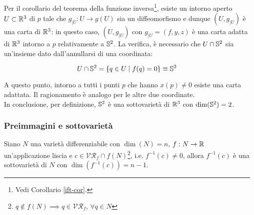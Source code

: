 Per il corollario del teorema della funzione inversa\footnote{%
	Vedi Corollario \ref{ift-cor}.%
}, esiste un intorno aperto $ U \subset \R^{3} $ di $ p $ tale che $ g_{|U} : U \to g(U) $ sia un diffeomorfismo e dunque $ (U,g_{|U}) $ è una carta di $ \R^{3} $: in questo caso, $ (U,g_{|U}) $ con $ g_{|U} = (f,y,z) $ è una carta adatta di $ \R^{3} $ intorno a $ p $ relativamente a $ \S^{2} $. La verifica, è necessario che $ U \cap \S^{2} $ sia un'insieme dato dall'annullarsi di una coordinata:

\begin{equation}
	U \cap \S^{2} = \{ q \in U \mid f(q) = 0 \} \equiv \S^{2}
\end{equation}

A questo punto, intorno a tutti i punti $ p $ che hanno $ x(p) \neq 0 $ esiste una carta adattata. Il ragionamento è analogo per le altre due coordinate.\\
In conclusione, per definizione, $ \S^{2}$ è una sottovarietà di $\R^{3} $ con $ \dim(\S^{2})=2 $.

\subsubsection{Preimmagini e sottovarietà}

\begin{theorem}[Preimmagine di un valore regolare (caso $ M = \R $)]
	Siano $ N $ una varietà differenziabile con $ \dim(N)=n $, $ f : N \to \R $ un'applicazione liscia e $ c \in \mathcal{VR}_{f} \cap f(N) $\footnote{%
		$ q \notin f(N) \implies q \in \mathcal{VR}_{f}, \, \forall q \in N $%
	}, i.e. $ f^{-1}(c) \neq 0 $, allora $ f^{-1}(c) $ è una sottovarietà di $ N $ con $ \dim(f^{-1}(c)) = n-1 $.
\end{theorem}

